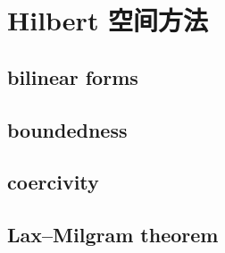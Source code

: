 \section{Hilbert 空间方法}
\label{b2:sec:1502}


\subsection{bilinear forms}
\label{b2:subsec:150201}

\subsection{boundedness}
\label{b2:subsec:150202}

\subsection{coercivity}
\label{b2:subsec:150203}

\subsection{Lax–Milgram theorem}
\label{b2:subsec:150204}



